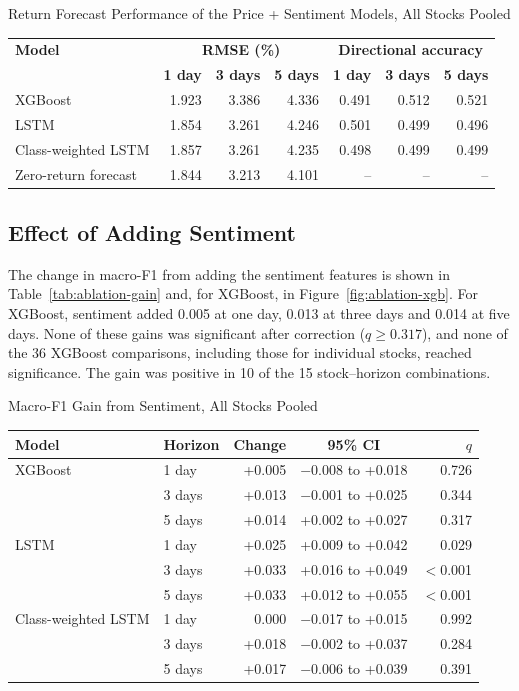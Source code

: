 \begin{utptable}{Return Forecast Performance of the Price + Sentiment Models, All Stocks Pooled}
\label{tab:rmse}
\begin{tabular}{@{}lrrrrrr@{}}
\toprule
\textbf{Model} & \multicolumn{3}{c}{\textbf{RMSE (\%)}} & \multicolumn{3}{c}{\textbf{Directional accuracy}} \\
 & \textbf{1 day} & \textbf{3 days} & \textbf{5 days} & \textbf{1 day} & \textbf{3 days} & \textbf{5 days} \\
\midrule
XGBoost & 1.923 & 3.386 & 4.336 & 0.491 & 0.512 & 0.521 \\
LSTM & 1.854 & 3.261 & 4.246 & 0.501 & 0.499 & 0.496 \\
Class-weighted LSTM & 1.857 & 3.261 & 4.235 & 0.498 & 0.499 & 0.499 \\
Zero-return forecast & 1.844 & 3.213 & 4.101 & -- & -- & -- \\
\bottomrule
\end{tabular}
\end{utptable}

\subsection{Effect of Adding Sentiment}
The change in macro-F1 from adding the sentiment features is shown in Table~\ref{tab:ablation-gain} and, for XGBoost, in Figure~\ref{fig:ablation-xgb}. For XGBoost, sentiment added 0.005 at one day, 0.013 at three days and 0.014 at five days. None of these gains was significant after correction ($q \geq 0.317$), and none of the 36 XGBoost comparisons, including those for individual stocks, reached significance. The gain was positive in 10 of the 15 stock--horizon combinations.

\begin{utptable}{Macro-F1 Gain from Sentiment, All Stocks Pooled}
\label{tab:ablation-gain}
\begin{tabular}{@{}llrcr@{}}
\toprule
\textbf{Model} & \textbf{Horizon} & \textbf{Change} & \textbf{95\% CI} & \textbf{$q$} \\
\midrule
XGBoost & 1 day & +0.005 & $-$0.008 to +0.018 & 0.726 \\
 & 3 days & +0.013 & $-$0.001 to +0.025 & 0.344 \\
 & 5 days & +0.014 & +0.002 to +0.027 & 0.317 \\
\midrule
LSTM & 1 day & +0.025 & +0.009 to +0.042 & 0.029 \\
 & 3 days & +0.033 & +0.016 to +0.049 & $<$0.001 \\
 & 5 days & +0.033 & +0.012 to +0.055 & $<$0.001 \\
\midrule
Class-weighted LSTM & 1 day & 0.000 & $-$0.017 to +0.015 & 0.992 \\
 & 3 days & +0.018 & $-$0.002 to +0.037 & 0.284 \\
 & 5 days & +0.017 & $-$0.006 to +0.039 & 0.391 \\
\bottomrule
\end{tabular}
\end{utptable}

